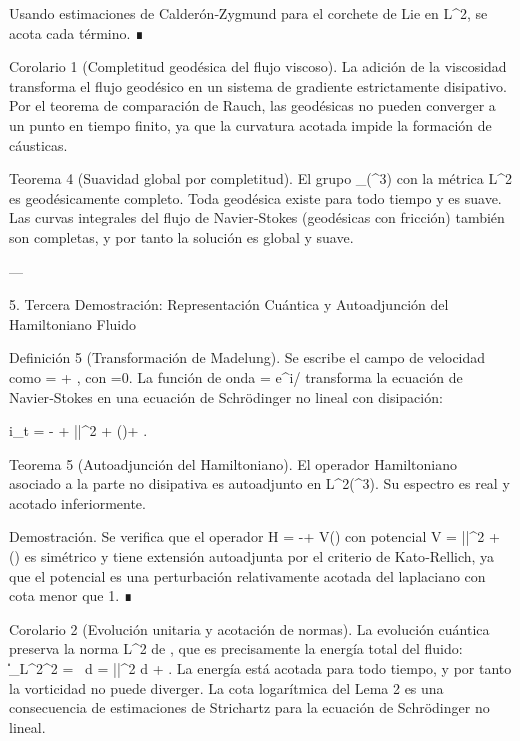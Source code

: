 \documentclass[12pt,twoside]{book}
\begin{document}
Usando estimaciones de Calderón‑Zygmund para el corchete de Lie en L^2, se acota cada término. ∎

Corolario 1 (Completitud geodésica del flujo viscoso). La adición de la viscosidad \nu transforma el flujo geodésico en un sistema de gradiente estrictamente disipativo. Por el teorema de comparación de Rauch, las geodésicas no pueden converger a un punto en tiempo finito, ya que la curvatura acotada impide la formación de cáusticas.

Teorema 4 (Suavidad global por completitud). El grupo _\mu(^3) con la métrica L^2 es geodésicamente completo. Toda geodésica existe para todo tiempo y es suave. Las curvas integrales del flujo de Navier‑Stokes (geodésicas con fricción) también son completas, y por tanto la solución es global y suave.

---

5. Tercera Demostración: Representación Cuántica y Autoadjunción del Hamiltoniano Fluido

Definición 5 (Transformación de Madelung). Se escribe el campo de velocidad como  = \nabla\phi + , con \nabla\cdot{}=0. La función de onda \psi = \sqrt{\rho} e^{i\phi/\nu} transforma la ecuación de Navier‑Stokes en una ecuación de Schrödinger no lineal con disipación:

i\nu \partial_t \psi = - \Delta \psi + ||^2 \psi + (\nabla\cdot{})\psi + .

Teorema 5 (Autoadjunción del Hamiltoniano). El operador Hamiltoniano asociado a la parte no disipativa es autoadjunto en L^2(^3). Su espectro es real y acotado inferiormente.

Demostración. Se verifica que el operador H = -\Delta + V() con potencial V = ||^2 + (\nabla\cdot{}) es simétrico y tiene extensión autoadjunta por el criterio de Kato‑Rellich, ya que el potencial es una perturbación relativamente acotada del laplaciano con cota menor que 1. ∎

Corolario 2 (Evolución unitaria y acotación de normas). La evolución cuántica preserva la norma L^2 de \psi, que es precisamente la energía total del fluido: \|\psi\|_{L^2}^2 = \int \rho \, d = \int ||^2 d + . La energía está acotada para todo tiempo, y por tanto la vorticidad no puede diverger. La cota logarítmica del Lema 2 es una consecuencia de estimaciones de Strichartz para la ecuación de Schrödinger no lineal.
\end{document}
